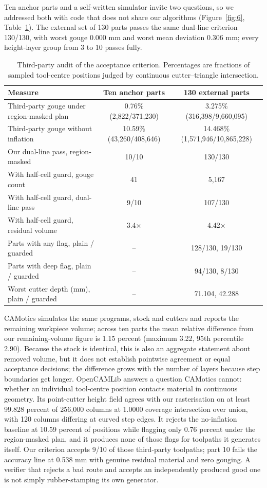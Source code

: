 Ten anchor parts and a self-written simulator invite two questions, so we addressed both with code that does not share our algorithms (Figure~\ref{fig:6}, Table~\ref{tab:4}). The external set of 130 parts passes the same dual-line criterion 130/130, with worst gouge 0.000 mm and worst mean deviation 0.306 mm; every height-layer group from 3 to 10 passes fully.

\begin{table}[htbp]\small
\caption{Third-party audit of the acceptance criterion. Percentages are fractions of sampled tool-centre positions judged by continuous cutter--triangle intersection.}
\centering
\begin{tabular}{lcc}
\toprule
Measure & Ten anchor parts & 130 external parts \\
\midrule
Third-party gouge under region-masked plan & 0.76\% (2,822/371,230) & 3.275\% (316,398/9,660,095) \\
Third-party gouge without inflation & 10.59\% (43,260/408,646) & 14.468\% (1,571,946/10,865,228) \\
Our dual-line pass, region-masked & 10/10 & 130/130 \\
With half-cell guard, gouge count & 41 & 5,167 \\
With half-cell guard, dual-line pass & 9/10 & 107/130 \\
With half-cell guard, residual volume & 3.4$\times$ & 4.42$\times$ \\
Parts with any flag, plain / guarded & -- & 128/130, 19/130 \\
Parts with deep flag, plain / guarded & -- & 94/130, 8/130 \\
Worst cutter depth (mm), plain / guarded & -- & 71.104, 42.288 \\
\bottomrule
\end{tabular}
\label{tab:4}
\end{table}

CAMotics simulates the same programs, stock and cutters and reports the remaining workpiece volume; across ten parts the mean relative difference from our remaining-volume figure is 1.15 percent (maximum 3.22, 95th percentile 2.90). Because the stock is identical, this is also an aggregate statement about removed volume, but it does not establish pointwise agreement or equal acceptance decisions; the difference grows with the number of layers because step boundaries get longer. OpenCAMLib answers a question CAMotics cannot: whether an individual tool-centre position contacts material in continuous geometry. Its point-cutter height field agrees with our rasterisation on at least 99.828 percent of 256,000 columns at 1.0000 coverage intersection over union, with 120 columns differing at curved step edges. It rejects the no-inflation baseline at 10.59 percent of positions while flagging only 0.76 percent under the region-masked plan, and it produces none of those flags for toolpaths it generates itself. Our criterion accepts 9/10 of those third-party toolpaths; part 10 fails the accuracy line at 0.538 mm with genuine residual material and zero gouging. A verifier that rejects a bad route and accepts an independently produced good one is not simply rubber-stamping its own generator.

